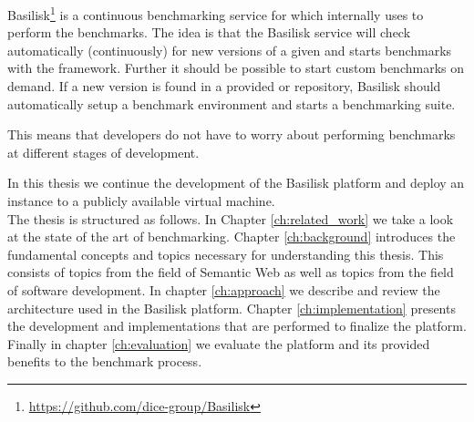 Basilisk\footnote{\url{https://github.com/dice-group/Basilisk}} is a continuous benchmarking service for \tsp{} which internally uses \iguana{} to perform the benchmarks.
The idea is that the Basilisk service will check automatically (continuously) for new versions of a given \tsp{} and starts benchmarks with the \iguana{} framework.
Further it should be possible to start custom benchmarks on demand.
If a new version is found in a provided \gh{} or \dockh{} repository, Basilisk should automatically setup a benchmark environment and starts a benchmarking suite.

This means that developers do not have to worry about performing benchmarks at different stages of development.

In this thesis we continue the development of the Basilisk platform and deploy an instance to a publicly available virtual machine.
\\

The thesis is structured as follows. 
In Chapter \ref{ch:related_work} we take a look at the state of the art of \ts{} benchmarking. 
Chapter \ref{ch:background} introduces the fundamental concepts and topics necessary for understanding this thesis.
This consists of topics from the field of Semantic Web as well as topics from the field of software development.
In chapter \ref{ch:approach} we describe and review the architecture used in the Basilisk platform.
Chapter \ref{ch:implementation} presents the development and implementations that are performed to finalize the platform.
Finally in chapter \ref{ch:evaluation} we evaluate the platform and its provided benefits to the \ts{} benchmark process.

